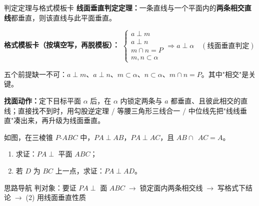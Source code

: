 \documentclass{exam-zh}
\begin{document}
\clearpage
{}


\begin{eduSolutionBox}{判定定理与格式模板卡}
  \begingroup
  \setlength{\parskip}{2.5mm}
\textbf{线面垂直判定定理：}一条直线与一个平面内的\textbf{两条相交直线}都垂直，则该直线与此平面垂直。\par
\textbf{格式模板卡（按填空写，再脱模板）：} $\begin{cases} a\perp m \\ a\perp n \\ m\cap n=P \\ m,n\subset\alpha \end{cases} \Rightarrow a\perp\alpha\quad(\text{线面垂直判定})$\par
五个前提缺一不可：$a\perp m$、$a\perp n$、$m\subset\alpha$、$n\subset\alpha$、$m\cap n=P$。其中"相交"是关键。\par
\textbf{找面动作：}定下目标平面 $\alpha$ 后，在 $\alpha$ 内锁定两条与 $a$ 都垂直、且彼此相交的直线；直接找不到时，用勾股逆定理 / 等腰三角形三线合一 / 中位线先把"线线垂直"凑出来，再升级为线面垂直。\par
  \endgroup
\end{eduSolutionBox}




\begin{eduProblemBlock}[例题 1]
\noindent
\begin{minipage}[t]{\dimexpr\linewidth-70mm-6mm\relax}
\vspace{0pt}
如图，在三棱锥 $P\text{-}ABC$ 中，$PA\perp AB$，$PA\perp AC$，且 $AB\cap\ \ AC=A$。
\begin{enumerate}[label=(\arabic*)]
  \item 求证：$PA\perp$ 平面 $ABC$；
\ \  \item 若 $D$ 为 $BC$ 上一点，求证：$PA\perp AD$。
\end{enumerate}

\end{minipage}\hfill
\begin{diagramcoltikz}{70mm}{三棱锥 P-ABC，观察 PA 与面 ABC 内两条相交线。}
}
\end{diagramcoltikz}
\end{eduProblemBlock}





\begin{eduAuxItem}{思路导航}
判对象：要证 $PA\perp$ 面 $ABC$$\;\to\;$锁定面内两条相交线$\;\to\;$写格式下结论$\;\to\;$(2) 用线面垂直性质\end{eduAuxItem}
\end{document}
